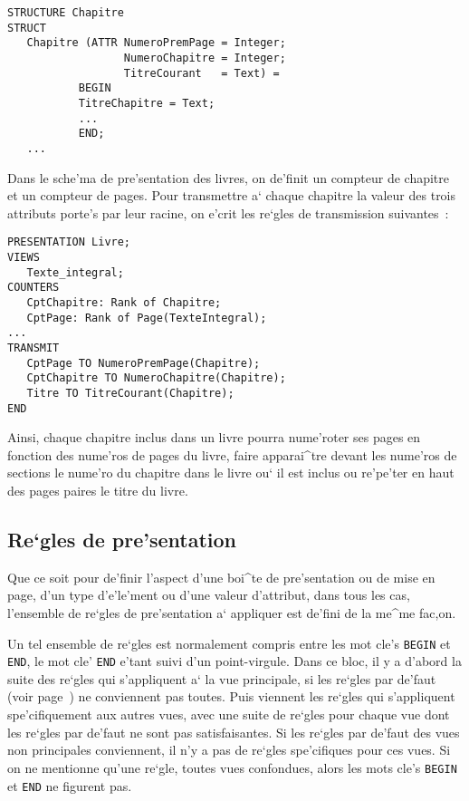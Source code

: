{\begin{example}
\begin{verbatim}
STRUCTURE Chapitre
STRUCT
   Chapitre (ATTR NumeroPremPage = Integer;
                  NumeroChapitre = Integer;
                  TitreCourant   = Text) =
           BEGIN
           TitreChapitre = Text;
           ...
           END;
   ...
\end{verbatim}

Dans le sche'ma de pre'sentation des livres, on de'finit un compteur de
chapitre et un compteur de pages. Pour transmettre a` chaque chapitre la
valeur des trois attributs porte's par leur racine, on e'crit les
re`gles de transmission suivantes~:

\begin{verbatim}
PRESENTATION Livre;
VIEWS
   Texte_integral;
COUNTERS
   CptChapitre: Rank of Chapitre;
   CptPage: Rank of Page(TexteIntegral);
...
TRANSMIT
   CptPage TO NumeroPremPage(Chapitre);
   CptChapitre TO NumeroChapitre(Chapitre);
   Titre TO TitreCourant(Chapitre);
END
\end{verbatim}

Ainsi, chaque chapitre inclus dans un livre pourra nume'roter ses pages
en fonction des nume'ros de pages du livre, faire apparai^tre devant les
nume'ros de sections le nume'ro du chapitre dans le livre ou` il est
inclus ou re'pe'ter en haut des pages paires le titre du livre.
\end{example}

\subsection{Re`gles de pre'sentation}

Que ce soit pour de'finir l'aspect d'une boi^te de pre'sentation ou
de mise en page, d'un type d'e'le'ment ou d'une valeur d'attribut,
dans tous les cas, l'ensemble de re`gles de pre'sentation a` appliquer
est de'fini de la me^me fac,on.

Un tel ensemble de re`gles est normalement compris entre les mot cle's
{\tt BEGIN} et {\tt END}, le mot cle' {\tt END} e'tant suivi d'un point-virgule.
Dans ce bloc, il y a d'abord la suite des re`gles qui s'appliquent a` la vue
principale, si les re`gles par de'faut (voir page~\pageref{reglesdefaut})
ne conviennent pas toutes. Puis viennent
les re`gles qui s'appliquent spe'cifiquement aux autres vues, avec une suite de
re`gles pour chaque vue dont les re`gles par de'faut ne sont pas satisfaisantes.
Si les re`gles par de'faut des vues non principales
conviennent, il n'y a pas de re`gles spe'cifiques pour ces vues.
Si on ne mentionne qu'une re`gle, toutes vues confondues, alors les
mots cle's {\tt BEGIN} et {\tt END} ne figurent pas.

}
